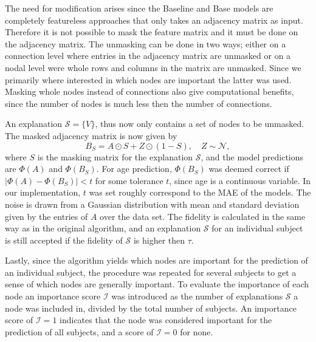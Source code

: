 The need for modification arises since the Baseline and Base models are completely featureless approaches that only takes an adjacency matrix as input. Therefore it is not possible to mask the feature matrix and it must be done on the adjacency matrix. The unmasking can be done in two ways; either on a connection level where entries in the adjacency matrix are unmasked or on a nodal level were whole rows and columns in the matrix are unmasked. Since we primarily where interested in which nodes are important the latter was used. Masking whole nodes instead of connections also give computational benefits, since the number of nodes is much less then the number of connections. 

An explanation $\mathcal{S} = \{V\}$, thus now only contains a set of nodes to be unmasked. The masked adjacency matrix is now given by 
\begin{equation*}
    B_S = A \odot S + Z \odot (1- S), \quad Z \sim \mathcal{N},
\end{equation*}
where $S$ is the masking matrix for the explanation $\mathcal{S}$, and the model predictions are $\Phi(A)$ and $\Phi(B_S)$. For age prediction, $\Phi(B_S)$ was deemed correct if $\left|\Phi(A) - \Phi(B_S)\right| < t$ for some tolerance $t$, since age is a continuous variable. In our implementation, $t$ was set roughly correspond to the MAE of the models. The noise is drawn from a Gaussian distribution with mean and standard deviation given by the entries of $A$ over the data set. The fidelity is calculated in the same way as in the original algorithm, and an explanation $\mathcal{S}$ for an individual subject is still accepted if the fidelity of $\mathcal{S}$ is higher then $\tau$. 

Lastly, since the algorithm yields which nodes are important for the prediction of an individual subject, the procedure was repeated for several subjects to get a sense of which nodes are generally important. To evaluate the importance of each node an importance score $\mathcal{I}$ was introduced as the number of explanations $\mathcal{S}$ a node was included in, divided by the total number of subjects. An importance score of $\mathcal{I}=1$ indicates that the node was considered important for the prediction of all subjects, and a score of $\mathcal{I}=0$ for none.  



